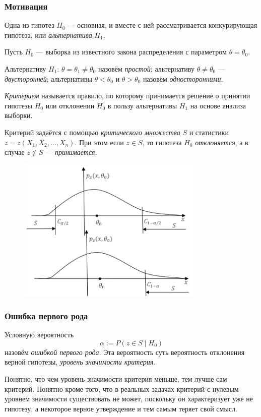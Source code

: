 \subsubsection{Мотивация}
Одна из гипотез $ H_0 $ --- основная, и вместе с ней рассматривается
конкурирующая гипотеза, или \emph{альтернатива} $ H_1 $.

\begin{definition}
Пусть $ H_0 $ --- выборка из известного закона распределения с параметром $
\theta = \theta_0 $.

Альтернативу $ H_1 $: $ \theta = \theta_1 \neq \theta_0 $ назовём
\emph{простой}; альтернативу $ \theta \neq \theta_0 $ --- \emph{двусторонней};
альтернативы $ \theta < \theta_0 $ и $ \theta > \theta_0 $ назовём
\emph{односторонними}.
\end{definition}

\begin{definition}
\emph{Критерием} называется правило, по которому принимается решение о принятии
гипотезы $H_0$ или отклонении $ H_0 $ в пользу альтернативы $ H_1 $ на основе
анализа выборки. 
\end{definition}
Критерий задаётся с помощью \emph{критического множества} $ S $ и статистики $ z
= z(X_1, X_2, \ldots, X_n)$. При этом если $ z \in S $, то гипотеза $ H_0 $
\textsl{отклоняется}, а в случае $ z \notin S$ --- \textsl{принимается}.

\begin{figure}[h!]
	\centering
	\includegraphics[width=0.8\textwidth]{Figures/9-plot1.png}
	\caption{}
	\label{fig:9-plot1-png}
\end{figure}

\subsubsection{Ошибка первого рода}
\begin{definition}
	Условную вероятность 
	\[
			\alpha := P(z\in S \mid H_0)
	\]
назовём \emph{ошибкой первого рода}. Эта вероятность суть вероятность отклонения
верной гипотезы, \emph{уровень значимости критерия}.
\end{definition}
Понятно, что чем уровень значимости критерия меньше, тем лучше сам критерий.
Понятно кроме того, что в реальных задачах критерий с нулевым уровнем
значимости существовать не может, поскольку он характеризует уже не гипотезу, а
некоторое верное утверждение и тем
самым теряет свой смысл.
 
